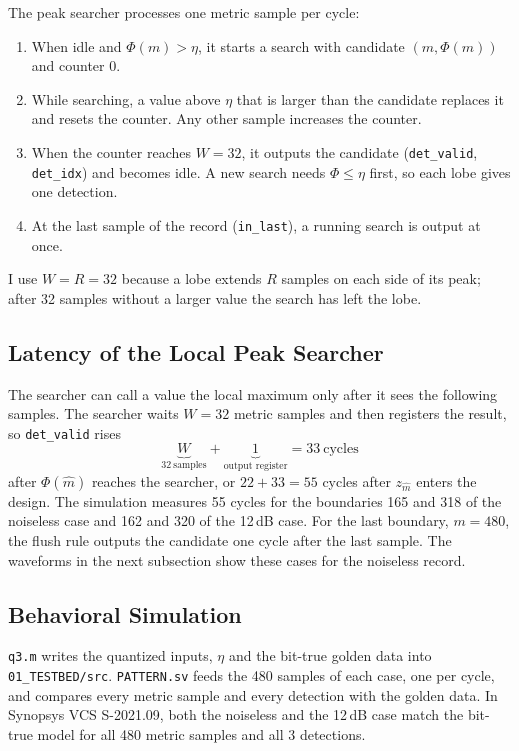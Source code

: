 \documentclass[12pt,a4paper]{report}
\begin{document}
The peak searcher processes one metric sample per cycle:
\begin{enumerate}[label=(\arabic*), leftmargin=1.6em]
    \item When idle and $\Phi(m) > \eta$, it starts a search with candidate $(m, \Phi(m))$ and counter 0.
    \item While searching, a value above $\eta$ that is larger than the candidate replaces it and resets the counter.
    Any other sample increases the counter.
    \item When the counter reaches $W = 32$, it outputs the candidate (\texttt{det\_valid}, \texttt{det\_idx}) and
    becomes idle. A new search needs $\Phi \le \eta$ first, so each lobe gives one detection.
    \item At the last sample of the record (\texttt{in\_last}), a running search is output at once.
\end{enumerate}
I use $W = R = 32$ because a lobe extends $R$ samples on each side of its peak; after 32 samples without a larger value
the search has left the lobe.

\subsection{Latency of the Local Peak Searcher}

The searcher can call a value the local maximum only after it sees the following samples. The searcher waits
$W = 32$ metric samples and then registers the result, so \texttt{det\_valid} rises
\begin{equation}
    \underbrace{W}_{32\ \text{samples}} + \underbrace{1}_{\text{output register}} = 33\ \text{cycles}
\end{equation}
after $\Phi(\hat m)$ reaches the searcher, or $22 + 33 = 55$ cycles after $z_{\hat m}$ enters the design. The
simulation measures 55 cycles for the boundaries 165 and 318 of the noiseless case and 162 and 320 of the 12\,dB case.
For the last boundary, $m = 480$, the flush rule outputs the candidate one cycle after the last sample. The waveforms in
the next subsection show these cases for the noiseless record.

\subsection{Behavioral Simulation}

\texttt{q3.m} writes the quantized inputs, $\eta$ and the bit-true golden data into \texttt{01\_TESTBED/src}.
\texttt{PATTERN.sv} feeds the 480 samples of each case, one per cycle, and compares every metric sample and every
detection with the golden data. In Synopsys VCS S-2021.09, both the noiseless and the 12\,dB case match the bit-true
model for all 480 metric samples and all 3 detections.
\end{document}
